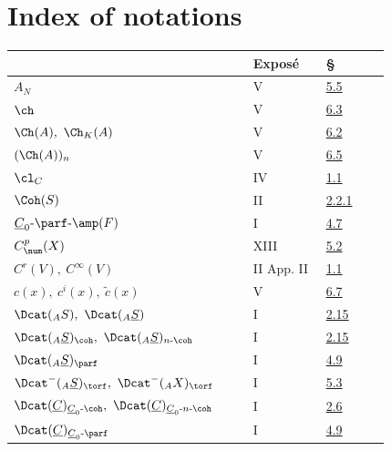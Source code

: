%

\section*{Index of notations}
\begingroup\small
\begin{longtable}{@{}>{\raggedright\arraybackslash}p{0.50\linewidth}>{\raggedright\arraybackslash}p{0.17\linewidth}>{\raggedright\arraybackslash}p{0.15\linewidth}@{}}
\toprule
 & Exposé & §\\
\midrule
\endhead
\(A_N\) & V & \hyperlink{sga6.e05.para.5-5}{5.5}\\
\(\ch\) & V & \hyperlink{sga6.e05.para.6-3}{6.3}\\
\(\Ch(A),\ \Ch_K(A)\) & V & \hyperlink{sga6.e05.def.6-2}{6.2}\\
\((\Ch(A))_n\) & V & \hyperlink{sga6.e05.prop.6-5}{6.5}\\
\(\cl_C\) & IV & \hyperlink{sga6.e04.para.1-1}{1.1}\\
\(\Coh(S)\) & II & \hyperlink{sga6.e02.notation.2-2-1}{2.2.1}\\
\(\underline{C}_0\text{-}\parf\text{-}\amp(F)\) & I & \hyperlink{sga6.e01.def.4-7}{4.7}\\
\(C^p_{\num}(X)\) & XIII & \hyperlink{sga6.e13.prop.5-2}{5.2}\\
\(C^r(V),\ C^\infty(V)\) & II App. II & \hyperlink{sga6.e02.sec.1.1}{1.1}\\
\(c(x),\ c^i(x),\ \widetilde c(x)\) & V & \hyperlink{sga6.e05.para.6-7}{6.7}\\
\(\Dcat({}_{A}S),\ \Dcat({}_{A}\underline S)\) & I & \hyperlink{sga6.e01.ex.2-15}{2.15}\\
\(\Dcat({}_{A}\underline S)_{\coh},\ \Dcat({}_{A}\underline S)_{n\text{-}\coh}\) & I & \hyperlink{sga6.e01.ex.2-15}{2.15}\\
\(\Dcat({}_{A}\underline S)_{\parf}\) & I & \hyperlink{sga6.e01.notation.4-9}{4.9}\\
\(\Dcat^{-}({}_{A}\underline S)_{\torf},\ \Dcat^{-}({}_{A}X)_{\torf}\) & I & \hyperlink{sga6.e01.para.5-3}{5.3}\\
\(\Dcat(\underline{C})_{\underline{C}_0\text{-}\coh},\ \Dcat(\underline{C})_{\underline{C}_0\text{-}n\text{-}\coh}\) & I & \hyperlink{sga6.e01.schol.2-6}{2.6}\\
\(\Dcat(\underline{C})_{\underline{C}_0\text{-}\parf}\) & I & \hyperlink{sga6.e01.notation.4-9}{4.9}\\

\end{longtable}
